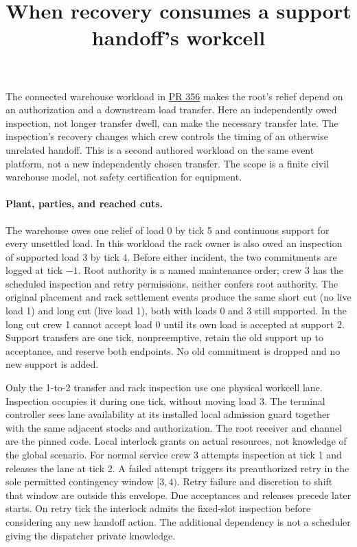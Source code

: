 \documentclass[11pt]{article}
\title{When recovery consumes a support handoff's workcell}
\date{}
\begin{document}
\maketitle
The connected warehouse workload in \href{https://github.com/eternal-november/eos-research-programmes/pull/356}{PR 356} makes the root's relief depend on an authorization and a downstream load transfer. Here an independently owed inspection, not longer transfer dwell, can make the necessary transfer late. The inspection's recovery changes which crew controls the timing of an otherwise unrelated handoff. This is a second authored workload on the same event platform, not a new independently chosen transfer. The scope is a finite civil warehouse model, not safety certification for equipment.

\paragraph{Plant, parties, and reached cuts.}
The warehouse owes one relief of load 0 by tick 5 and continuous support for every unsettled load. In this workload the rack owner is also owed an inspection of supported load 3 by tick 4. Before either incident, the two commitments are logged at tick $-1$. Root authority is a named maintenance order; crew 3 has the scheduled inspection and retry permissions, neither confers root authority. The original placement and rack settlement events produce the same short cut (no live load 1) and long cut (live load 1), both with loads 0 and 3 still supported. In the long cut crew 1 cannot accept load 0 until its own load is accepted at support 2. Support transfers are one tick, nonpreemptive, retain the old support up to acceptance, and reserve both endpoints. No old commitment is dropped and no new support is added.

Only the 1-to-2 transfer and rack inspection use one physical workcell lane. Inspection occupies it during one tick, without moving load 3. The terminal controller sees lane availability at its installed local admission guard together with the same adjacent stocks and authorization. The root receiver and channel are the pinned code. Local interlock grants on actual resources, not knowledge of the global scenario. For normal service crew 3 attempts inspection at tick 1 and releases the lane at tick 2. A failed attempt triggers its preauthorized retry in the sole permitted contingency window $[3,4)$. Retry failure and discretion to shift that window are outside this envelope. Due acceptances and releases precede later starts. On retry tick the interlock admits the fixed-slot inspection before considering any new handoff action. The additional dependency is not a scheduler giving the dispatcher private knowledge.
\end{document}
